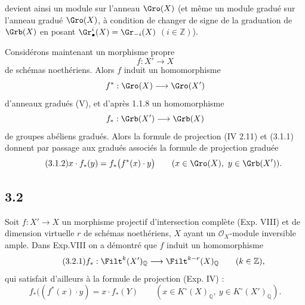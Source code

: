 devient ainsi un module sur l'anneau \(\Gro(X)\) (et même un module gradué sur l'anneau gradué \(\Gro(X)\), à condition de changer de signe de la graduation de \(\Grb(X)\) en posant \(\Gr^i_\bullet(X)=\Gr_{-i}(X)\) \((i\in\mathbb Z)\)).

Considérons maintenant un morphisme propre
\[
 f:X'\longrightarrow X
\]
de schémas noethériens. Alors \(f\) induit un homomorphisme
\[
 f^*:\Gro(X)\longrightarrow\Gro(X')
\]
d'anneaux gradués (V), et d'après 1.1.8 un homomorphisme
\[
 f_*:\Grb(X')\longrightarrow\Grb(X)
\]
de groupes abéliens gradués. Alors la formule de projection (IV 2.11) et (3.1.1) donnent par passage aux gradués associés la formule de projection graduée
\begin{equation}\tag{3.1.2}
 x\cdot f_*(y)=f_*\bigl(f^*(x)\cdot y\bigr)
 \qquad (x\in\Gro(X),\ y\in\Grb(X')).
\end{equation}

\subsection*{3.2}
Soit \(f:X'\to X\) un morphisme projectif d'intersection complète (Exp. VIII) et de dimension virtuelle \(r\) de schémas noethériens, \(X\) ayant un \(\mathcal O_X\)-module inversible ample. Dans Exp.VIII on a démontré que \(f\) induit un homomorphisme
\begin{equation}\tag{3.2.1}
 f_*:\Filt^k(X')_{\mathbb Q}\longrightarrow\Filt^{k-r}(X)_{\mathbb Q}\qquad(k\in\mathbb Z),
\end{equation}
qui satisfait d'ailleurs à la formule de projection (Exp. IV) :
\begin{equation}\tag{3.2.2}
 f_*((f^*(x)\cdot y)=x\cdot f_*(Y)
 \qquad (x\in K^\circ(X)_{\mathbb Q},\ y\in K^\circ(X')_{\mathbb Q}).
\end{equation}
